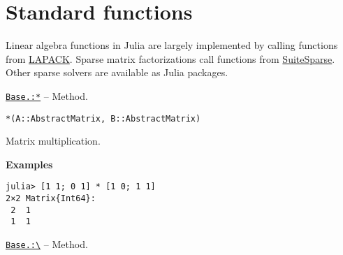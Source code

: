 \hypertarget{10454442684761744234}{}


\section{Standard functions}



Linear algebra functions in Julia are largely implemented by calling functions from \href{http://www.netlib.org/lapack/}{LAPACK}. Sparse matrix factorizations call functions from \href{http://suitesparse.com}{SuiteSparse}. Other sparse solvers are available as Julia packages.


\hypertarget{10986430109256282246}{}
\hyperlink{10986430109256282246}{\texttt{Base.:*}}  -- {Method.}

\begin{adjustwidth}{2em}{0pt}


\begin{verbatim}
*(A::AbstractMatrix, B::AbstractMatrix)
\end{verbatim}

Matrix multiplication.

\textbf{Examples}


\begin{verbatim}
julia> [1 1; 0 1] * [1 0; 1 1]
2×2 Matrix{Int64}:
 2  1
 1  1
\end{verbatim}



\end{adjustwidth}
\hypertarget{13978854286838009457}{}
\hyperlink{13978854286838009457}{\texttt{Base.:{\textbackslash}}}  -- {Method.}

